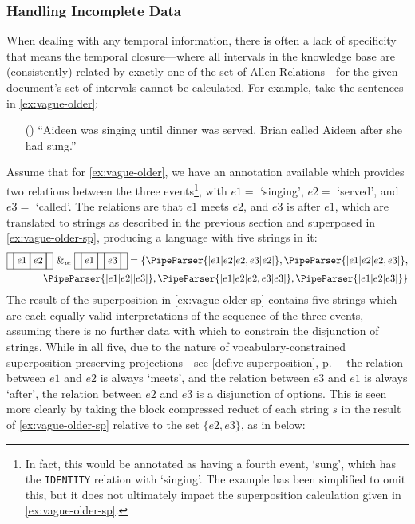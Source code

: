 \documentclass[a4paper,12pt,leqno]{article}
\newcommand{\vph}[1]{\vphantom{#1}}
\newcommand{\ebox}[1]{\fbox{$\vph{'(),}#1$}}
\newcommand{\nbBefore}[2]{\ebox{#1}\ebox{}\ebox{#2}}
\newcommand{\nbMeets}[2]{\ebox{#1}\ebox{#2}}
\newcommand{\nbAfter}[2]{\nbBefore{#2}{#1}}
\newcommand{\Meets}[2]{\ebox{}\nbMeets{#1}{#2}\ebox{}}
\newcommand{\After}[2]{\ebox{}\nbAfter{#1}{#2}\ebox{}}
\newcommand{\spvc}{~\&_{v\!c}~}
\newcommand{\EventString}[1]{%
	\renewcommand*{\do}[1]{\ebox{##1}}%
	\PipeParser{#1}%
}
\newcommand{\ipp}{(\refstepcounter{equation}\theequation)}
\begin{document}
\subsubsection{Handling Incomplete Data}\label{ssub:incomplete}
When dealing with any temporal information, there is often a lack of specificity that means the temporal closure---where all intervals in the knowledge base are (consistently) related by exactly one of the set of Allen Relations---for the given document's set of intervals cannot be calculated. For example, take the sentences in \cref{ex:vague-older}:
\begin{itemize}
	\item[\ipp\label{ex:vague-older}] ``Aideen was singing until dinner was served. Brian called Aideen after she had sung.''
\end{itemize}
Assume that for \cref{ex:vague-older}, we have an annotation available which provides two relations between the three events\footnote{In fact, this would be annotated as having a fourth event, `sung', which has the \texttt{IDENTITY} relation with `singing'. The example has been simplified to omit this, but it does not ultimately impact the superposition calculation given in \cref{ex:vague-older-sp}.}, with $e1 = $ `singing', $e2 = $ `served', and $e3 = $ `called'. The relations are that $e1$ meets $e2$, and $e3$ is after $e1$, which are translated to strings as described in the previous section and superposed in \cref{ex:vague-older-sp}, producing a language with five strings in it:
\begin{align}
	\Meets{e1}{e2} \spvc \After{e3}{e1} = \{\EventString{{}|e1|e2|e2,e3|e2|{}}, \EventString{{}|e1|e2|e2,e3|{}},\label{ex:vague-older-sp}\\
	\EventString{{}|e1|e2|{}|e3|{}}, \EventString{{}|e1|e2|e2,e3|e3|{}}, \EventString{{}|e1|e2|e3|{}}\}\notag
\end{align}
The result of the superposition in \cref{ex:vague-older-sp} contains five strings which are each equally valid interpretations of the sequence of the three events, assuming there is no further data with which to constrain the disjunction of strings. While in all five, due to the nature of vocabulary-constrained superposition preserving projections---see \cref{def:vc-superposition}, p. \pageref{def:vc-superposition}---the relation between $e1$ and $e2$ is always `meets', and the relation between $e3$ and $e1$ is always `after', the relation between $e2$ and $e3$ is a disjunction of options. This is seen more clearly by taking the block compressed reduct of each string $s$ in the result of \cref{ex:vague-older-sp} relative to the set $\{e2, e3\}$, as in  below:
\end{document}
